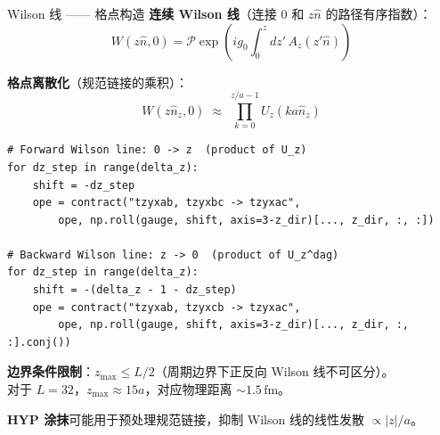 \documentclass[10pt,aspectratio=169]{beamer}
\newcommand{\fm}{\,\mathrm{fm}}
\begin{document}
\begin{frame}[fragile]{Wilson 线 —— 格点构造}
\small
\textbf{连续 Wilson 线}（连接 $0$ 和 $z\hat{n}$ 的路径有序指数）：
\begin{equation}
  W(z\hat{n}, 0) = \mathcal{P}\exp\!\left(i g_0 \int_0^z dz'\, A_z(z'\hat{n})\right)
\end{equation}

\textbf{格点离散化}（规范链接的乘积）：
\begin{equation}
  \boxed{
  W(z\hat{n}_z, 0) \;\approx\; \prod_{k=0}^{z/a-1} U_z(k a \hat{n}_z)
  }
\end{equation}

\begin{lstlisting}
# Forward Wilson line: 0 -> z  (product of U_z)
for dz_step in range(delta_z):
    shift = -dz_step
    ope = contract("tzyxab, tzyxbc -> tzyxac",
        ope, np.roll(gauge, shift, axis=3-z_dir)[..., z_dir, :, :])

# Backward Wilson line: z -> 0  (product of U_z^dag)
for dz_step in range(delta_z):
    shift = -(delta_z - 1 - dz_step)
    ope = contract("tzyxab, tzyxcb -> tzyxac",
        ope, np.roll(gauge, shift, axis=3-z_dir)[..., z_dir, :, :].conj())
\end{lstlisting}

\textbf{边界条件限制}：$z_{\max} \le L/2$（周期边界下正反向 Wilson 线不可区分）。\\
对于 $L=32$，$z_{\max} \approx 15a$，对应物理距离 $\sim 1.5\fm$。

\textbf{HYP 涂抹}可能用于预处理规范链接，抑制 Wilson 线的线性发散 $\propto |z|/a$。
\end{frame}
\end{document}
